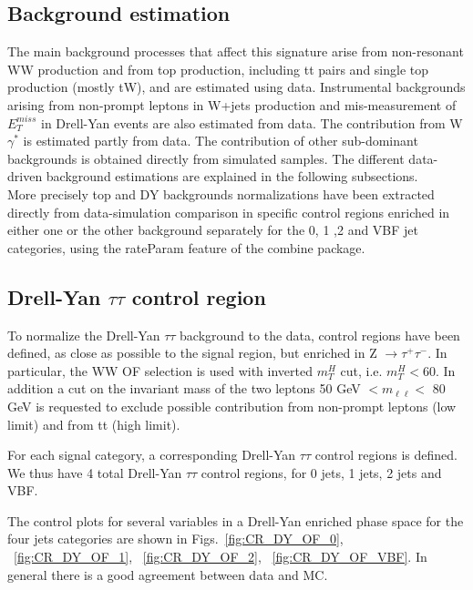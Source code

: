 





\subsection{Background estimation}
The main background processes that affect this signature arise from non-resonant WW production and from top production, including tt pairs and single top production (mostly tW), and are estimated using data. Instrumental backgrounds arising from non-prompt leptons in
W+jets production and mis-measurement of $E_T^{miss}$ in Drell-Yan events are also estimated from
data. The contribution from W$\gamma^*$  is estimated partly from data. The
contribution of other sub-dominant backgrounds is obtained directly from simulated samples. The different data-driven background estimations are explained in the following subsections.\\
\newline
More precisely top and DY backgrounds normalizations have been extracted
directly from
data-simulation comparison in specific control regions enriched in either one
or the other background separately for the 0, 1 ,2 and VBF jet categories, using the rateParam feature of the combine package.


\subsection{Drell-Yan $\tau\tau$ control region}
To normalize the Drell-Yan $\tau\tau$ background to the data, control regions
have been defined, as close as possible to the signal region, but enriched in
Z $\rightarrow \tau^+ \tau^-$. In particular, the WW OF selection is used with
inverted $m_T^H$ cut, i.e. $m_T^H<60$. In addition a cut on the invariant mass
of the two leptons 50 GeV $< m_{\ell \ell} <$ 80 GeV is requested to exclude
possible contribution from non-prompt leptons (low limit) and from tt (high
limit).

For each signal category, a corresponding Drell-Yan $\tau\tau$ control
regions is defined. We thus have 4 total  Drell-Yan $\tau\tau$ control
regions, for 0 jets, 1 jets, 2 jets and VBF.

The control plots for several variables in a Drell-Yan enriched phase space
for the four jets categories are shown in Figs.~\ref{fig:CR_DY_OF_0},
~\ref{fig:CR_DY_OF_1}, ~\ref{fig:CR_DY_OF_2}, ~\ref{fig:CR_DY_OF_VBF}.
In general there is a good agreement between data and MC.\\

